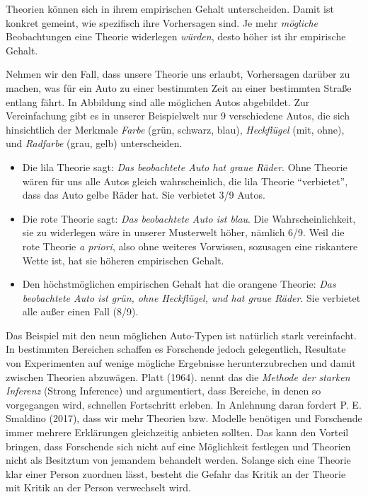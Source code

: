 \documentclass[
  letterpaper,
  DIV=11,
  numbers=noendperiod]{scrreprt}
\begin{document}
\begin{tcolorbox}[enhanced jigsaw, title=\textcolor{quarto-callout-tip-color}{\faLightbulb}\hspace{0.5em}{Empirischer Gehalt und Strong Inference}, colbacktitle=quarto-callout-tip-color!10!white, rightrule=.15mm, titlerule=0mm, left=2mm, bottomrule=.15mm, arc=.35mm, leftrule=.75mm, toprule=.15mm, opacityback=0, breakable, bottomtitle=1mm, colframe=quarto-callout-tip-color-frame, toptitle=1mm, opacitybacktitle=0.6, coltitle=black, colback=white]

Theorien können sich in ihrem empirischen Gehalt unterscheiden. Damit
ist konkret gemeint, wie spezifisch ihre Vorhersagen sind. Je mehr
\emph{mögliche} Beobachtungen eine Theorie widerlegen \emph{würden},
desto höher ist ihr empirische Gehalt.

Nehmen wir den Fall, dass unsere Theorie uns erlaubt, Vorhersagen
darüber zu machen, was für ein Auto zu einer bestimmten Zeit an einer
bestimmten Straße entlang fährt. In Abbildung sind alle möglichen Autos
abgebildet. Zur Vereinfachung gibt es in unserer Beispielwelt nur 9
verschiedene Autos, die sich hinsichtlich der Merkmale \emph{Farbe}
(grün, schwarz, blau), \emph{Heckflügel} (mit, ohne), und
\emph{Radfarbe} (grau, gelb) unterscheiden.

\begin{itemize}
\item
  Die lila Theorie sagt: \emph{Das beobachtete Auto hat graue Räder}.
  Ohne Theorie wären für uns alle Autos gleich wahrscheinlich, die lila
  Theorie ``verbietet'', dass das Auto gelbe Räder hat. Sie verbietet
  3/9 Autos.
\item
  Die rote Theorie sagt: \emph{Das beobachtete Auto ist blau}. Die
  Wahrscheinlichkeit, sie zu widerlegen wäre in unserer Musterwelt
  höher, nämlich 6/9. Weil die rote Theorie \emph{a priori}, also ohne
  weiteres Vorwissen, sozusagen eine riskantere Wette ist, hat sie
  höheren empirischen Gehalt.
\item
  Den höchstmöglichen empirischen Gehalt hat die orangene Theorie:
  \emph{Das beobachtete Auto ist grün, ohne Heckflügel, und hat graue
  Räder}. Sie verbietet alle außer einen Fall (8/9).
\end{itemize}

Das Beispiel mit den neun möglichen Auto-Typen ist natürlich stark
vereinfacht. In bestimmten Bereichen schaffen es Forschende jedoch
gelegentlich, Resultate von Experimenten auf wenige mögliche Ergebnisse
herunterzubrechen und damit zwischen Theorien abzuwägen. Platt (1964).
nennt das die \emph{Methode der starken Inferenz} (Strong Inference) und
argumentiert, dass Bereiche, in denen so vorgegangen wird, schnellen
Fortschritt erleben. In Anlehnung daran fordert P. E. Smaldino (2017),
dass wir mehr Theorien bzw. Modelle benötigen und Forschende immer
mehrere Erklärungen gleichzeitig anbieten sollten. Das kann den Vorteil
bringen, dass Forschende sich nicht auf eine Möglichkeit festlegen und
Theorien nicht als Besitztum von jemandem behandelt werden. Solange sich
eine Theorie klar einer Person zuordnen lässt, besteht die Gefahr das
Kritik an der Theorie mit Kritik an der Person verwechselt wird.


\end{tcolorbox}
\end{document}
